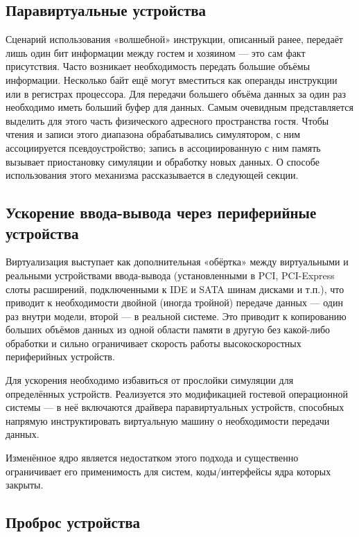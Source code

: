 \subsection{Паравиртуальные устройства}

Сценарий использования «волшебной» инструкции, описанный ранее, передаёт лишь один бит информации между гостем и хозяином --- это сам факт присутствия. Часто возникает необходимость передать большие объёмы информации. Несколько байт ещё могут вместиться как операнды инструкции или в регистрах процессора. Для передачи большего объёма данных за один раз необходимо иметь больший буфер для данных. Самым очевидным представляется выделить для этого часть физического адресного пространства гостя. Чтобы чтения и записи этого диапазона обрабатывались симулятором, с ним ассоциируется псевдоустройство; запись в ассоциированную с ним память вызывает приостановку симуляции и обработку новых данных. О способе использования этого механизма рассказывается в следующей секции.

\subsection[Ускорение ввода-вывода]{Ускорение ввода-вывода через периферийные устройства}

Виртуализация выступает как дополнительная «обёртка» между виртуальными и реальными устройствами ввода-вывода (установленными в PCI, PCI-Express слоты расширений, подключенными к IDE и SATA шинам дисками и т.п.), что приводит к необходимости двойной (иногда тройной) передаче данных --- один раз внутри модели, второй --- в реальной системе. Это приводит к копированию больших объёмов данных из одной области памяти в другую без какой-либо обработки и сильно ограничивает скорость работы высокоскоростных периферийных устройств.

Для ускорения необходимо избавиться от прослойки симуляции для определённых устройств. Реализуется это модификацией гостевой операционной системы --- в неё включаются драйвера паравиртуальных устройств, способных напрямую инструктировать виртуальную машину о необходимости передачи данных.

Изменённое ядро является недостатком этого подхода и существенно ограничивает его применимость для систем, коды/интерфейсы ядра которых закрыты.

\subsection{Проброс устройства}

